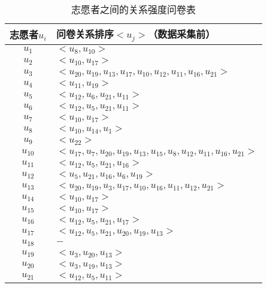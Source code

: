 \begin{table}[htb]
  \centering
  \begin{minipage}[t]{0.8\linewidth} %
  \caption[真实结果]{志愿者之间的关系强度问卷表}
  \label{tab:truthresult}
    \begin{tabular*}{\linewidth}{cp{10cm}}
      \toprule[1.5pt]
      {志愿者\mbox{$u_{i}$}} & {问卷关系排序\mbox{$<u_{j}>$}（数据采集前）}  \\
      \midrule[1pt]
      \mbox{$u_{1}$} & \mbox{$<u_{8},u_{10}>$}  \\
      \mbox{$u_{2}$} & \mbox{$<u_{10},u_{17}>$}  \\
      \mbox{$u_{3} $}&\mbox{$ <u_{20},u_{19},u_{13},u_{17},u_{10},u_{12},u_{11},u_{16},u_{21}>$}\\
      \mbox{$u_{4}$} & \mbox{$<u_{11},u_{19}>$}\\
      \mbox{$u_{5} $}& \mbox{$<u_{12},u_{6},u_{21},u_{11}>$}\\
      \mbox{$u_{6}$} & \mbox{$<u_{12},u_{5},u_{21},u_{11}>$}\\
      \mbox{$u_{7}$} & \mbox{$<u_{10},u_{17}>$}\\
      \mbox{$u_{8}$} &\mbox{$ <u_{10},u_{14},u_{1}>$}\\
      \mbox{$u_{9} $}& \mbox{$<u_{22}>$}\\
      \mbox{$u_{10} $}& \mbox{$<u_{17},u_{7},u_{20},u_{19},u_{13},u_{15},u_{8},u_{12},u_{11},u_{16},u_{21}>$}\\
      \mbox{$u_{11} $}&  \mbox{$<u_{12},u_{5},u_{21},u_{16}>$}\\
      \mbox{$u_{12} $}& \mbox{$ <u_{5},u_{21},u_{16},u_{6},u_{19}>$}\\
      \mbox{$u_{13}$} &\mbox{$ <u_{20},u_{19},u_{3},u_{17},u_{10},u_{16},u_{11},u_{12},u_{21}>$}\\
      \mbox{$u_{14}$} &\mbox{$ <u_{10},u_{17} >$}\\
      \mbox{$u_{15}$} & \mbox{$<u_{10},u_{17}>$}\\
      \mbox{$u_{16}$} &\mbox{$ <u_{12},u_{5},u_{21},u_{17}>$}\\
      \mbox{$u_{17} $}& \mbox{$< u_{12},u_{5},u_{21},u_{20},u_{19},u_{13}   >$}\\
      \mbox{$u_{18} $}&\mbox{$ -$}\\
      \mbox{$u_{19} $}&\mbox{$ <u_{3},u_{20},u_{13}>$}\\
      \mbox{$u_{20}$} & \mbox{$<u_{3},u_{19},u_{13}>$}\\
      \mbox{$u_{21}$} & \mbox{$ <u_{12},u_{5},u_{11}>$}\\

\end{tabular*}
\end{minipage}
\end{table}
